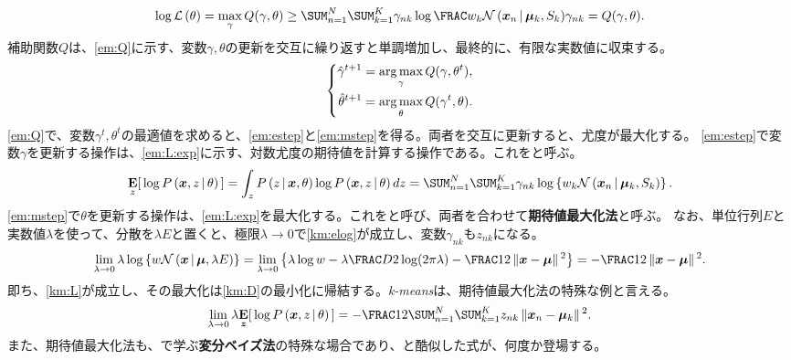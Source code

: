 \documentclass[10pt,a4paper]{book}
\begin{document}
%
\begin{equation}
\label{eq:em:jensen}
\log \Lk{\theta} =
\max_\gamma Q(\gamma,\theta) \geq
\sum_{n=1}^N \sum_{k=1}^K \gamma_{nk} \log \frac{w_k \Nd{\bm{x}_n}{\bm{\mu}_k,S_k}}{\gamma_{nk}} =
Q(\gamma,\theta).
\end{equation}
%
補助関数$Q$は、\eqref{em:Q}に示す、変数$\gamma,\theta$の更新を交互に繰り返すと単調増加し、最終的に、有限な実数値に収束する。
%
\begin{equation}
\label{eq:em:Q}
\left\{
\begin{aligned}
\hat{\gamma}^{t+1} &= \operatorname*{arg\,max}_{\gamma} Q(\gamma,\theta^t), \\
\hat{\theta}^{t+1} &= \operatorname*{arg\,max}_{\theta} Q(\gamma^t,\theta).
\end{aligned}
\right.
\end{equation}
%
\eqref{em:Q}で、変数$\gamma^t,\theta^t$の最適値を求めると、\eqref{em:estep}と\eqref{em:mstep}を得る。両者を交互に更新すると、尤度が最大化する。
\eqref{em:estep}で変数$\gamma$を更新する操作は、\eqref{em:L:exp}に示す、対数尤度の期待値を計算する操作である。これを\Estep{}と呼ぶ。
%
\begin{equation}
\label{eq:em:L:exp}
\E[z]{\log \Prob{\bm{x},z}[\theta]} =
\int_z \Prob{z}[\bm{x},\theta] \log \Prob{\bm{x},z}[\theta] dz =
\sum_{n=1}^N \sum_{k=1}^K \gamma_{nk} \log \seq{w_k \Nd{\bm{x}_n}{\bm{\mu}_k,S_k}}.
\end{equation}
%
\eqref{em:mstep}で$\theta$を更新する操作は、\eqref{em:L:exp}を最大化する。これを\Mstep{}と呼び、両者を合わせて\textbf{期待値最大化法}と呼ぶ。
なお、単位行列$E$と実数値$\lambda$を使って、分散を$\lambda E$と置くと、極限$\lambda\to0$で\eqref{km:elog}が成立し、変数$\gamma_{nk}$も$z_{nk}$になる。
%
\begin{equation}
\label{eq:km:elog}
\lim_{\lambda\to0} \lambda\log \seq{w \Nd{\bm{x}}{\bm{\mu},\lambda E}} =
\lim_{\lambda\to0} \seq{\lambda\log w - \lambda\frac{D}{2} \log (2\pi\lambda) - \frac{1}{2} \norm{\bm{x}-\bm{\mu}}^2} =
-\frac{1}{2} \norm{\bm{x}-\bm{\mu}}^2.
\end{equation}
%
即ち、\eqref{km:L}が成立し、その最大化は\eqref{km:D}の最小化に帰結する。\textit{k-means}は、期待値最大化法の特殊な例と言える。
%
\begin{equation}
\label{eq:km:L}
\lim_{\lambda\to0} \lambda \E[\bm{z}]{\log \Prob{\bm{x},z}[\theta]} =
-\frac{1}{2} \sum_{n=1}^N \sum_{k=1}^K z_{nk} \norm{\bm{x}_n-\bm{\mu}_k}^2.
\end{equation}
%
また、期待値最大化法も、で学ぶ\textbf{変分ベイズ法}の特殊な場合であり、と酷似した式が、何度か登場する。
\end{document}
